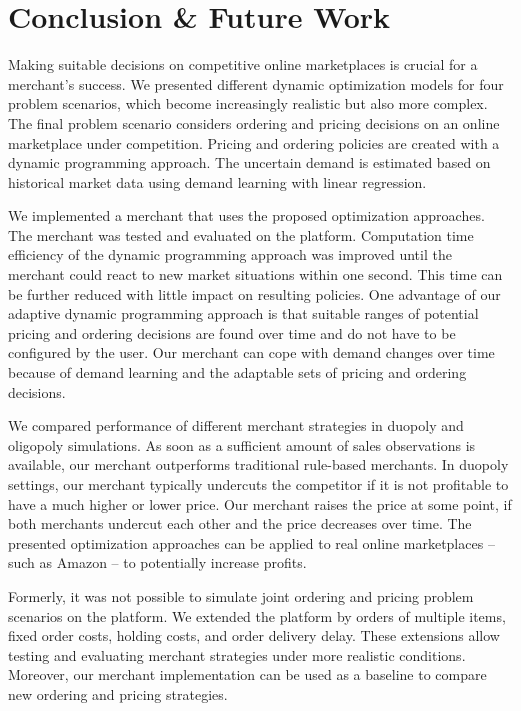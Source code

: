 
\chapter{Conclusion \& Future Work}
\label{chapter:conclusion}

Making suitable decisions on competitive online marketplaces is crucial for a merchant's success.
We presented different dynamic optimization models for four problem scenarios, which become increasingly realistic but also more complex.
The final problem scenario considers ordering and pricing decisions on an online marketplace under competition.
Pricing and ordering policies are created with a dynamic programming approach.
The uncertain demand is estimated based on historical market data using demand learning with linear regression.

We implemented a merchant that uses the proposed optimization approaches.
The merchant was tested and evaluated on the \pricewars platform.
Computation time efficiency of the dynamic programming approach was improved until the merchant could react to new market situations within one second.
This time can be further reduced with little impact on resulting policies.
One advantage of our adaptive dynamic programming approach is that suitable ranges of potential pricing and ordering decisions are found over time and do not have to be configured by the user.
Our merchant can cope with demand changes over time because of demand learning and the adaptable sets of pricing and ordering decisions. 

We compared performance of different merchant strategies in duopoly and oligopoly simulations.
As soon as a sufficient amount of sales observations is available, our merchant outperforms traditional rule-based merchants.
In duopoly settings, our merchant typically undercuts the competitor if it is not profitable to have a much higher or lower price.
Our merchant raises the price at some point, if both merchants undercut each other and the price decreases over time.
The presented optimization approaches can be applied to real online marketplaces -- such as Amazon -- to potentially increase profits.

Formerly, it was not possible to simulate joint ordering and pricing problem scenarios on the \pricewars platform.
We extended the platform by orders of multiple items, fixed order costs, holding costs, and order delivery delay.
These extensions allow testing and evaluating merchant strategies under more realistic conditions.
Moreover, our merchant implementation can be used as a baseline to compare new ordering and pricing strategies.

